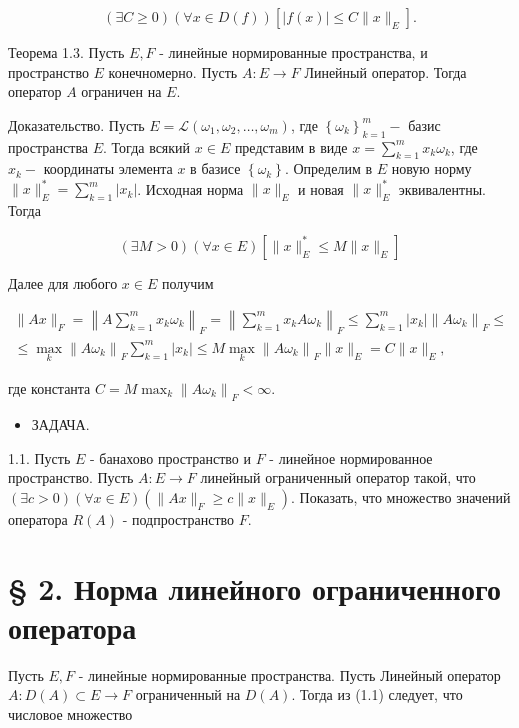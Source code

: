 $$
	(\exists C \geq 0)(\forall x \in D(f))\left[|f(x)| \leq C\|x\|_{E}\right] .
$$

Теорема 1.3. Пусть $E, F$ - линейные нормированные пространства, $и$ пространство $E$ конечномерно. Пусть $A: E \rightarrow F$ Линейный оператор. Тогда оператор $A$ ограничен на $E$.

Доказательство. Пусть $E=\mathscr{L}\left(\omega_{1}, \omega_{2}, \ldots, \omega_{m}\right)$, где $\left\{\omega_{k}\right\}_{k=1}^{m}-$ базис пространства $E$. Тогда всякий $x \in E$ представим в виде $x=\sum_{k=1}^{m} x_{k} \omega_{k}$, где $x_{k}-$ координаты элемента $x$ в базисе $\left\{\omega_{k}\right\}$. Определим в $E$ новую норму $\|x\|_{E}^{*}=\sum_{k=1}^{m}\left|x_{k}\right|$. Исходная норма $\|x\|_{E}$ и новая $\|x\|_{E}^{*}$ эквивалентны. Тогда

$$
	(\exists M>0)(\forall x \in E)\left[\|x\|_{E}^{*} \leq M\|x\|_{E}\right]
$$

Далее для любого $x \in E$ получим

$$
	\begin{gathered}
		\|A x\|_{F}=\left\|A \sum_{k=1}^{m} x_{k} \omega_{k}\right\|_{F}=\left\|\sum_{k=1}^{m} x_{k} A \omega_{k}\right\|_{F} \leq \sum_{k=1}^{m}\left|x_{k}\right|\left\|A \omega_{k}\right\|_{F} \leq \\
		\leq \max _{k}\left\|A \omega_{k}\right\|_{F} \sum_{k=1}^{m}\left|x_{k}\right| \leq M \max _{k}\left\|A \omega_{k}\right\|_{F}\|x\|_{E}=C\|x\|_{E},
	\end{gathered}
$$

где константа $C=M \max _{k}\left\|A \omega_{k}\right\|_{F}<\infty$. $~$

\begin{itemize}
	\item ЗАДАЧА.
\end{itemize}

1.1. Пусть $E$ - банахово пространство и $F$ - линейное нормированное пространство. Пусть $A: E \rightarrow F$ линейный ограниченный оператор такой, что $(\exists c>0)(\forall x \in E)\left(\|A x\|_{F} \geq c\|x\|_{E}\right)$. Показать, что множество значений оператора $R(A)$ - подпространство $F$.

\section*{§ 2. Норма линейного ограниченного оператора}
Пусть $E, F$ - линейные нормированные пространства. Пусть Линейный оператор $A: D(A) \subset E \rightarrow F$ ограниченный на $D(A)$. Тогда из (1.1) следует, что числовое множество

